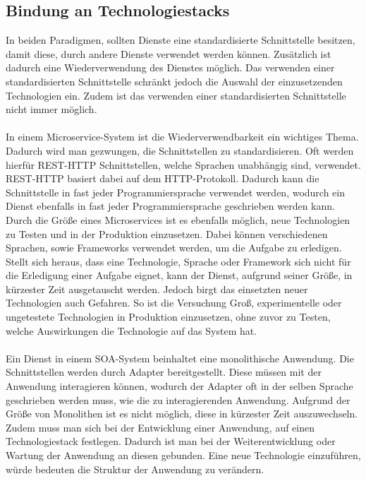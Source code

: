 \subsection{Bindung an Technologiestacks}
\label{subsec:BindungAnTechnologiestacks}
In beiden Paradigmen, sollten Dienste eine standardisierte Schnittstelle besitzen, damit diese, durch andere Dienste verwendet werden können. Zusätzlich ist dadurch eine Wiederverwendung des Dienstes möglich. Das verwenden einer standardisierten Schnittstelle schränkt jedoch die Auswahl der einzusetzenden Technologien ein. Zudem ist das verwenden einer standardisierten Schnittstelle nicht immer möglich.
\\\\
In einem Microservice-System ist die Wiederverwendbarkeit ein wichtiges Thema. Dadurch wird man gezwungen, die Schnittstellen zu standardisieren. Oft werden hierfür REST-HTTP Schnittstellen, welche Sprachen unabhängig sind, verwendet. REST-HTTP basiert dabei auf dem HTTP-Protokoll. Dadurch kann die Schnittstelle in fast jeder Programmiersprache verwendet werden, wodurch ein Dienst ebenfalls in fast jeder Programmiersprache geschrieben werden kann. Durch die Größe eines Microservices ist es ebenfalls möglich, neue Technologien zu Testen und in der Produktion einzusetzen. Dabei können verschiedenen Sprachen, sowie Frameworks verwendet werden, um die Aufgabe zu erledigen. Stellt sich heraus, dass eine Technologie, Sprache oder Framework sich nicht für die Erledigung einer Aufgabe eignet, kann der Dienst, aufgrund seiner Größe, in kürzester Zeit ausgetauscht werden. Jedoch birgt das einsetzten neuer Technologien auch Gefahren. So ist die Versuchung Groß, experimentelle oder ungetestete Technologien in Produktion einzusetzen, ohne zuvor zu Testen, welche Auswirkungen die Technologie auf das System hat.
\\\\
Ein Dienst in einem SOA-System beinhaltet eine monolithische Anwendung. Die Schnittstellen werden durch Adapter bereitgestellt. Diese müssen mit der Anwendung interagieren können, wodurch der Adapter oft in der selben Sprache geschrieben werden muss, wie die zu interagierenden Anwendung. Aufgrund der Größe von Monolithen ist es nicht möglich, diese in kürzester Zeit auszuwechseln. Zudem muss man sich bei der Entwicklung einer Anwendung, auf einen Technologiestack festlegen. Dadurch ist man bei der Weiterentwicklung oder Wartung der Anwendung an diesen gebunden. Eine neue Technologie einzuführen, würde bedeuten die Struktur der Anwendung zu verändern.

